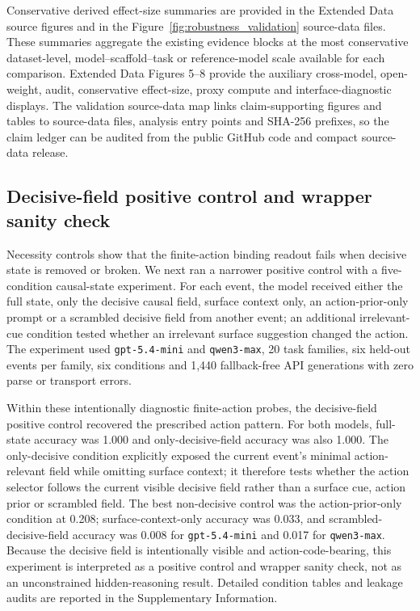 ﻿\documentclass[preprint,12pt,authoryear]{elsarticle}
\begin{document}
Conservative derived effect-size summaries are provided in the Extended Data source figures and in the Figure~\ref{fig:robustness_validation} source-data files. These summaries aggregate the existing evidence blocks at the most conservative dataset-level, model--scaffold--task or reference-model scale available for each comparison. Extended Data Figures 5--8 provide the auxiliary cross-model, open-weight, audit, conservative effect-size, proxy compute and interface-diagnostic displays. The validation source-data map links claim-supporting figures and tables to source-data files, analysis entry points and SHA-256 prefixes, so the claim ledger can be audited from the public GitHub code and compact source-data release.
\FloatBarrier

\subsection{Decisive-field positive control and wrapper sanity check}

Necessity controls show that the finite-action binding readout fails when decisive state is removed or broken. We next ran a narrower positive control with a five-condition causal-state experiment. For each event, the model received either the full state, only the decisive causal field, surface context only, an action-prior-only prompt or a scrambled decisive field from another event; an additional irrelevant-cue condition tested whether an irrelevant surface suggestion changed the action. The experiment used \texttt{gpt-5.4-mini} and \texttt{qwen3-max}, 20 task families, six held-out events per family, six conditions and 1,440 fallback-free API generations with zero parse or transport errors.

Within these intentionally diagnostic finite-action probes, the decisive-field positive control recovered the prescribed action pattern. For both models, full-state accuracy was 1.000 and only-decisive-field accuracy was also 1.000. The only-decisive condition explicitly exposed the current event's minimal action-relevant field while omitting surface context; it therefore tests whether the action selector follows the current visible decisive field rather than a surface cue, action prior or scrambled field. The best non-decisive control was the action-prior-only condition at 0.208; surface-context-only accuracy was 0.033, and scrambled-decisive-field accuracy was 0.008 for \texttt{gpt-5.4-mini} and 0.017 for \texttt{qwen3-max}. Because the decisive field is intentionally visible and action-code-bearing, this experiment is interpreted as a positive control and wrapper sanity check, not as an unconstrained hidden-reasoning result. Detailed condition tables and leakage audits are reported in the Supplementary Information.
\end{document}
